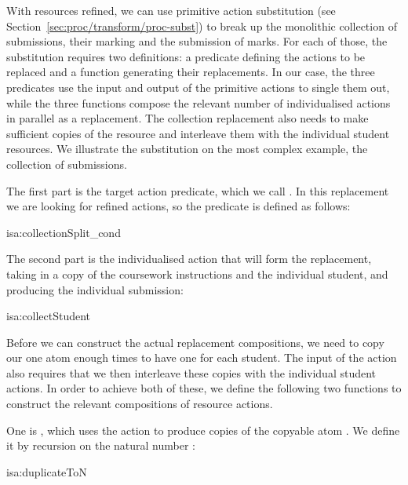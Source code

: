 \documentclass[class=smolathesis,crop=false]{standalone}
\begin{document}
With resources refined, we can use primitive action substitution (see Section~\ref{sec:proc/transform/proc-subst}) to break up the monolithic collection of submissions, their marking and the submission of marks.
For each of those, the substitution requires two definitions: a predicate defining the actions to be replaced and a function generating their replacements.
In our case, the three predicates use the input and output of the primitive actions to single them out, while the three functions compose the relevant number of individualised actions in parallel as a replacement.
The collection replacement also needs to make sufficient copies of the  resource and interleave them with the individual student resources.
We illustrate the substitution on the most complex example, the collection of submissions.

The first part is the target action predicate, which we call .
In this replacement we are looking for refined  actions, so the predicate is defined as follows:
\begin{isadef}{isa:collectionSplit_cond}
  
\end{isadef}

The second part is the individualised action that will form the replacement, taking in a copy of the coursework instructions and the individual student, and producing the individual submission:
\begin{isadef}{isa:collectStudent}
  
\end{isadef}

Before we can construct the actual replacement compositions, we need to copy our one  atom enough times to have one for each student.
The input of the  action also requires that we then interleave these copies with the individual student actions.
In order to achieve both of these, we define the following two functions to construct the relevant compositions of resource actions.

One is , which uses the  action to produce  copies of the copyable atom .
We define it by recursion on the natural number :
\pagebreak
\begin{isadef}{isa:duplicateToN}
  
\end{isadef}
\end{document}
